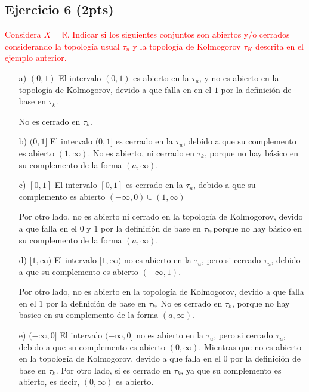\documentclass[
]{article}
\begin{document}
\hypertarget{ejercicio-6-2pts}{%
\subsection{Ejercicio 6 (2pts)}\label{ejercicio-6-2pts}}

\textcolor{red}{Considera $X=\mathbb{R}$. Indicar si los siguientes conjuntos son abiertos y/o cerrados considerando la topología usual $\tau_u$ y la topología de Kolmogorov $\tau_K$ descrita en el ejemplo anterior.}

\begin{itemize}
\item[a)] $(0,1)$
El intervalo $(0,1)$ es abierto en la $\tau_u$, y no es abierto en la topología de Kolmogorov, devido a que falla en en el $1$ por la definición de base  en $\tau_k$.

No es cerrado en $\tau_k$.
 
\item[b)] $(0,1]$
El intervalo $(0,1]$ es cerrado en la $\tau_u$, debido a que su complemento es abierto $(1,\infty)$.
No es abierto, ni cerrado en $\tau_k$, porque no hay básico en su complemento de la forma $(a, \infty)$.
\item[c)] $[0,1]$
El intervalo $[0,1]$ es cerrado en la $\tau_u$, debido a que su complemento es abierto $(-\infty, 0) \cup (1,\infty)$

Por otro lado, no es abierto ni cerrado en la topología de Kolmogorov, devido a que falla en el $0$ y $1$ por la definición de base  en $\tau_k$.porque no hay básico en su complemento de la forma $(a, \infty)$.

\item[d)] $[1, \infty)$
El intervalo $[1, \infty)$ no es abierto en la $\tau_u$, pero si cerrado $\tau_u$, debido a que su complemento es abierto $(-\infty,1)$.

Por otro lado, no es abierto en la topología de Kolmogorov, devido a que falla en el $1$ por la definición de base  en $\tau_k$.
No es cerrado en $\tau_k$, porque no hay basico en su complemento de la forma $(a, \infty)$.

\item[e)] $(- \infty,0]$
El intervalo $(- \infty,0]$ no es abierto en la $\tau_u$, pero si cerrado $\tau_u$, debido a que su complemento es abierto $(0,\infty)$.
Mientras que no es abierto en la topología de Kolmogorov, devido a que falla en el $0$ por la definición de base  en $\tau_k$.
Por otro lado, si es cerrado en $\tau_k$, ya que su complemento es abierto, es decir, $(0,\infty)$ es abierto.
\end{itemize}
\end{document}

